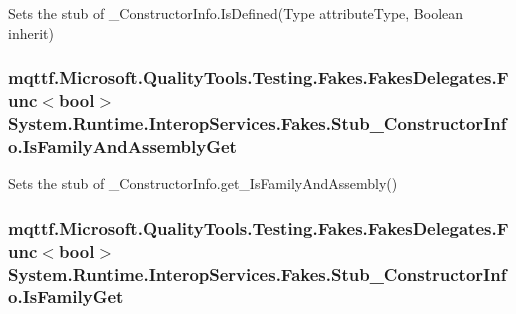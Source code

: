 Sets the stub of \-\_\-\-Constructor\-Info.\-Is\-Defined(\-Type attribute\-Type, Boolean inherit)

\hypertarget{class_system_1_1_runtime_1_1_interop_services_1_1_fakes_1_1_stub___constructor_info_a282a09d11f124bc874756724e5be53ee}{
\subsubsection[{Is\-Family\-And\-Assembly\-Get}]{\setlength{\rightskip}{0pt plus 5cm}mqttf.\-Microsoft.\-Quality\-Tools.\-Testing.\-Fakes.\-Fakes\-Delegates.\-Func$<$bool$>$ System.\-Runtime.\-Interop\-Services.\-Fakes.\-Stub\-\_\-\-Constructor\-Info.\-Is\-Family\-And\-Assembly\-Get}}\label{class_system_1_1_runtime_1_1_interop_services_1_1_fakes_1_1_stub___constructor_info_a282a09d11f124bc874756724e5be53ee}


Sets the stub of \-\_\-\-Constructor\-Info.\-get\-\_\-\-Is\-Family\-And\-Assembly()

\hypertarget{class_system_1_1_runtime_1_1_interop_services_1_1_fakes_1_1_stub___constructor_info_a9ee0365563e0af17c1c1f814badfc88d}{
\subsubsection[{Is\-Family\-Get}]{\setlength{\rightskip}{0pt plus 5cm}mqttf.\-Microsoft.\-Quality\-Tools.\-Testing.\-Fakes.\-Fakes\-Delegates.\-Func$<$bool$>$ System.\-Runtime.\-Interop\-Services.\-Fakes.\-Stub\-\_\-\-Constructor\-Info.\-Is\-Family\-Get}}\label{class_system_1_1_runtime_1_1_interop_services_1_1_fakes_1_1_stub___constructor_info_a9ee0365563e0af17c1c1f814badfc88d}


